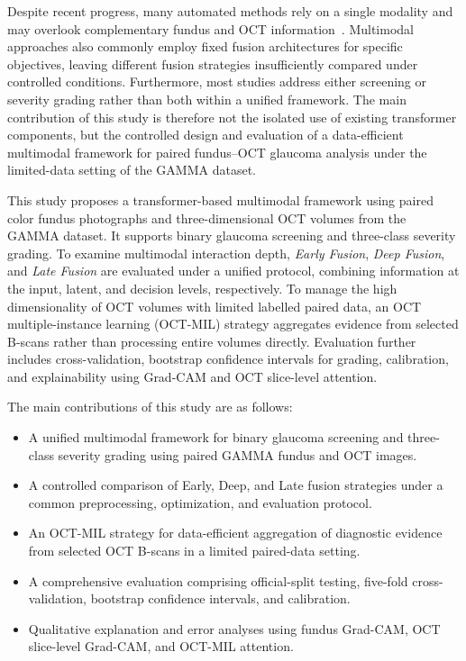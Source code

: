 \documentclass{ieeeaccess}
\begin{document}
Despite recent progress, many automated methods rely on a single modality and may overlook complementary fundus and OCT information~\cite{dai2021transmed,meedeniya2025glaucoma}. Multimodal approaches also commonly employ fixed fusion architectures for specific objectives, leaving different fusion strategies insufficiently compared under controlled conditions. Furthermore, most studies address either screening or severity grading rather than both within a unified framework. The main contribution of this study is therefore not the isolated use of existing transformer components, but the controlled design and evaluation of a data-efficient multimodal framework for paired fundus--OCT glaucoma analysis under the limited-data setting of the GAMMA dataset.

This study proposes a transformer-based multimodal framework using paired color fundus photographs and three-dimensional OCT volumes from the GAMMA dataset. It supports binary glaucoma screening and three-class severity grading. To examine multimodal interaction depth, \textit{Early Fusion}, \textit{Deep Fusion}, and \textit{Late Fusion} are evaluated under a unified protocol, combining information at the input, latent, and decision levels, respectively. To manage the high dimensionality of OCT volumes with limited labelled paired data, an OCT multiple-instance learning (OCT-MIL) strategy aggregates evidence from selected B-scans rather than processing entire volumes directly. Evaluation further includes cross-validation, bootstrap confidence intervals for grading, calibration, and explainability using Grad-CAM and OCT slice-level attention.

The main contributions of this study are as follows:
\begin{itemize}
    \item A unified multimodal framework for binary glaucoma screening and three-class severity grading using paired GAMMA fundus and OCT images.
    \item A controlled comparison of Early, Deep, and Late fusion strategies under a common preprocessing, optimization, and evaluation protocol.
    \item An OCT-MIL strategy for data-efficient aggregation of diagnostic evidence from selected OCT B-scans in a limited paired-data setting.
    \item A comprehensive evaluation comprising official-split testing, five-fold cross-validation, bootstrap confidence intervals, and calibration.
    \item Qualitative explanation and error analyses using fundus Grad-CAM, OCT slice-level Grad-CAM, and OCT-MIL attention.
\end{itemize}
\end{document}
